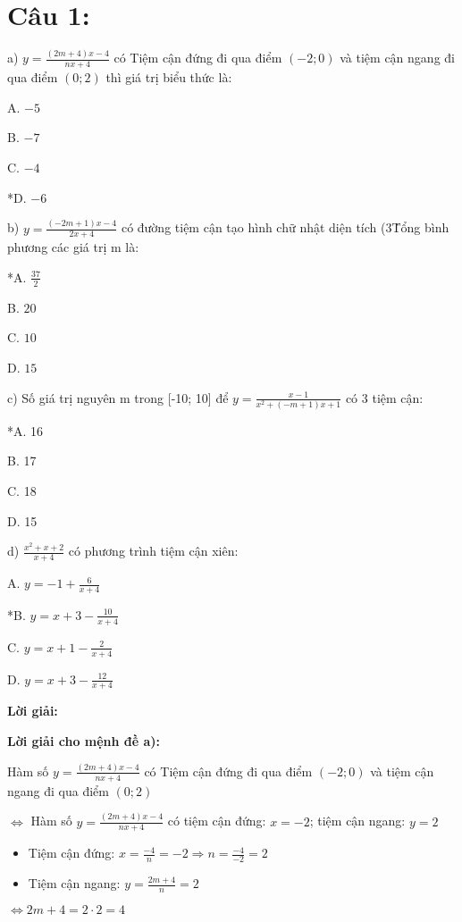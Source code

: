 \documentclass{article}
\begin{document}
\section*{Câu 1:}

a) \(y = \frac{(2m + 4)x - 4}{nx + 4}\) có Tiệm cận đứng đi qua điểm \((-2; 0)\) và tiệm cận ngang đi qua điểm \((0; 2)\) thì giá trị biểu thức là:

A. \(-5\)

B. \(-7\)

C. \(-4\)

*D. \(-6\)


b) \(y = \frac{(-2m + 1)x - 4}{2x + 4}\) có đường tiệm cận tạo hình chữ nhật diện tích (3\. Tổng bình phương các giá trị m là:

*A. \(\frac{37}{2}\)

B. \(20\)

C. \(10\)

D. \(15\)


c) Số giá trị nguyên m trong [-10; 10] để \(y = \frac{x - 1}{x^2 + (-m + 1)x + 1}\) có 3 tiệm cận:

*A. 16

B. 17

C. 18

D. 15


d) \(\frac{x^2 + x + 2}{x + 4}\) có phương trình tiệm cận xiên:

A. \(y = -1 + \frac{6}{x + 4}\)

*B. \(y = x + 3 - \frac{10}{x + 4}\)

C. \(y = x + 1 - \frac{2}{x + 4}\)

D. \(y = x + 3 - \frac{12}{x + 4}\)


\textbf{Lời giải:}

\textbf{Lời giải cho mệnh đề a):}

Hàm số \(y = \frac{(2m + 4)x - 4}{nx + 4}\) có Tiệm cận đứng đi qua điểm \((-2; 0)\) và tiệm cận ngang đi qua điểm \((0; 2)\)

\(\Leftrightarrow\) Hàm số \(y = \frac{(2m + 4)x - 4}{nx + 4}\) có tiệm cận đứng: \(x = -2\); tiệm cận ngang: \(y = 2\)

\begin{itemize}
\item Tiệm cận đứng:
\(x = \frac{-4}{n} = -2 \Rightarrow n = \frac{-4}{-2} = 2\)
\item Tiệm cận ngang:
\(y = \frac{2m + 4}{n} = 2\)
\end{itemize}

\(\Leftrightarrow 2m + 4 = 2 \cdot 2 = 4\)
\end{document}
